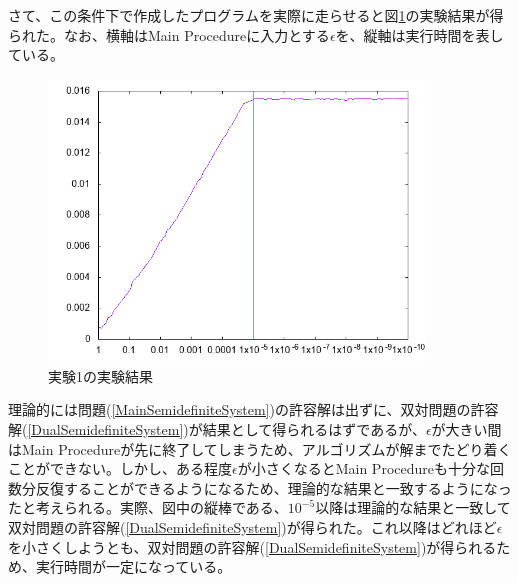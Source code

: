 さて、この条件下で作成したプログラムを実際に走らせると図\ref{test1}の実験結果が得られた。なお、横軸はMain Procedureに入力とする$\epsilon$を、縦軸は実行時間を表している。
\begin{figure}
  \centering
  \includegraphics[width=10cm]{test1.png}
  \caption{実験1の実験結果}
  \label{test1}
\end{figure}

理論的には問題(\ref{MainSemidefiniteSystem})の許容解は出ずに、双対問題の許容解(\ref{DualSemidefiniteSystem})が結果として得られるはずであるが、$\epsilon$が大きい間はMain Procedureが先に終了してしまうため、アルゴリズムが解までたどり着くことができない。しかし、ある程度$\epsilon$が小さくなるとMain Procedureも十分な回数分反復することができるようになるため、理論的な結果と一致するようになったと考えられる。実際、図中の縦棒である、$10^{-5}$以降は理論的な結果と一致して双対問題の許容解(\ref{DualSemidefiniteSystem})が得られた。これ以降はどれほど$\epsilon$を小さくしようとも、双対問題の許容解(\ref{DualSemidefiniteSystem})が得られるため、実行時間が一定になっている。

